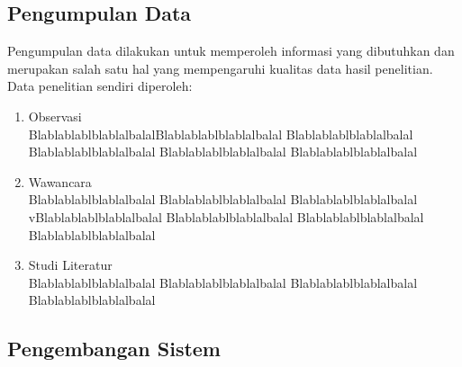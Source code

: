 \subsection{Pengumpulan Data}
Pengumpulan data dilakukan untuk memperoleh informasi yang
dibutuhkan dan merupakan salah satu hal yang mempengaruhi kualitas data hasil penelitian. Data penelitian sendiri diperoleh:
\begin{enumerate}[nolistsep,leftmargin=0.5cm]
\item Observasi \\
BlablablablblablalbalalBlablablablblablalbalal Blablablablblablalbalal Blablablablblablalbalal Blablablablblablalbalal Blablablablblablalbalal
\item Wawancara \\
Blablablablblablalbalal Blablablablblablalbalal Blablablablblablalbalal vBlablablablblablalbalal Blablablablblablalbalal Blablablablblablalbalal Blablablablblablalbalal
\item Studi Literatur \\
Blablablablblablalbalal Blablablablblablalbalal Blablablablblablalbalal Blablablablblablalbalal
\end{enumerate}

\subsection{Pengembangan Sistem}

